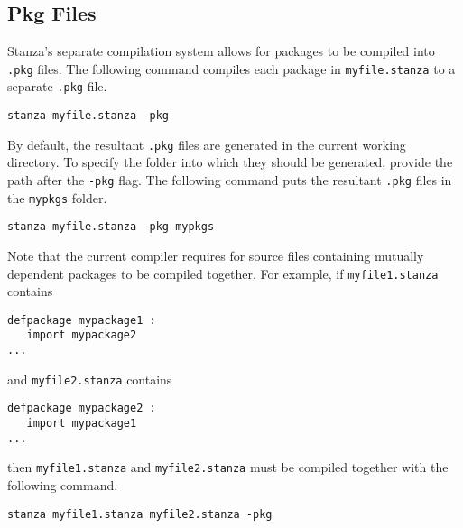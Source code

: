 \documentclass[10pt,oneside]{book}
\begin{document}
\subsection*{Pkg Files}
Stanza's separate compilation system allows for packages to be compiled into \texttt{\frenchspacing .pkg} files. The following command compiles each package in \texttt{\frenchspacing myfile.stanza} to a separate \texttt{\frenchspacing .pkg} file.
\begin{lstlisting}
stanza myfile.stanza -pkg
\end{lstlisting}

By default, the resultant \texttt{\frenchspacing .pkg} files are generated in the current working directory. To specify the folder into which they should be generated, provide the path after the \texttt{\frenchspacing -pkg} flag. The following command puts the resultant \texttt{\frenchspacing .pkg} files in the \texttt{\frenchspacing mypkgs} folder.
\begin{lstlisting}
stanza myfile.stanza -pkg mypkgs
\end{lstlisting}

Note that the current compiler requires for source files containing mutually dependent packages to be compiled together. For example, if \texttt{\frenchspacing myfile1.stanza} contains 
\begin{lstlisting}
defpackage mypackage1 :
   import mypackage2
...   
\end{lstlisting}
and \texttt{\frenchspacing myfile2.stanza} contains
\begin{lstlisting}
defpackage mypackage2 :
   import mypackage1
...
\end{lstlisting}
then \texttt{\frenchspacing myfile1.stanza} and \texttt{\frenchspacing myfile2.stanza} must be compiled together with the following command.
\begin{lstlisting}
stanza myfile1.stanza myfile2.stanza -pkg
\end{lstlisting}
\end{document}
